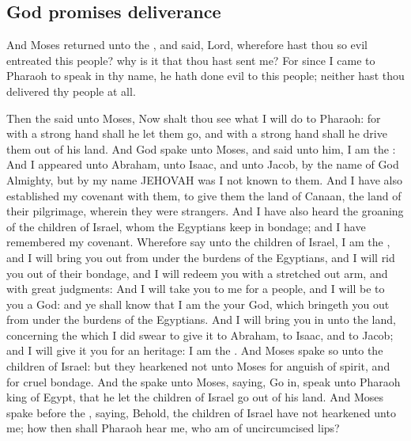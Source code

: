 \begin{biblechapter}
\section*{God promises deliverance}
\verse And Moses returned unto the \LORD, and said, Lord, wherefore hast thou so evil entreated this people? why is it that thou hast sent me?
\verse For since I came to Pharaoh to speak in thy name, he hath done evil to this people; neither hast thou delivered thy people at all.
\end{biblechapter}

\begin{biblechapter} %
\verse Then the \LORD said unto Moses, Now shalt thou see what I will do to Pharaoh: for with a strong hand shall he let them go, and with a strong hand shall he drive them out of his land.
\verse And God spake unto Moses, and said unto him, I am the \LORD:
\verse And I appeared unto Abraham, unto Isaac, and unto Jacob, by the name of God Almighty, but by my name JEHOVAH was I not known to them.
\verse And I have also established my covenant with them, to give them the land of Canaan, the land of their pilgrimage, wherein they were strangers.
\verse And I have also heard the groaning of the children of Israel, whom the Egyptians keep in bondage; and I have remembered my covenant.
\verse Wherefore say unto the children of Israel, I am the \LORD, and I will bring you out from under the burdens of the Egyptians, and I will rid you out of their bondage, and I will redeem you with a stretched out arm, and with great judgments:
\verse And I will take you to me for a people, and I will be to you a God: and ye shall know that I am the \LORD your God, which bringeth you out from under the burdens of the Egyptians.
\verse And I will bring you in unto the land, concerning the which I did swear to give it to Abraham, to Isaac, and to Jacob; and I will give it you for an heritage: I am the \LORD.
\verse And Moses spake so unto the children of Israel: but they hearkened not unto Moses for anguish of spirit, and for cruel bondage.
\verse And the \LORD spake unto Moses, saying,
\verse Go in, speak unto Pharaoh king of Egypt, that he let the children of Israel go out of his land.
\verse And Moses spake before the \LORD, saying, Behold, the children of Israel have not hearkened unto me; how then shall Pharaoh hear me, who am of uncircumcised lips?

\end{biblechapter}
